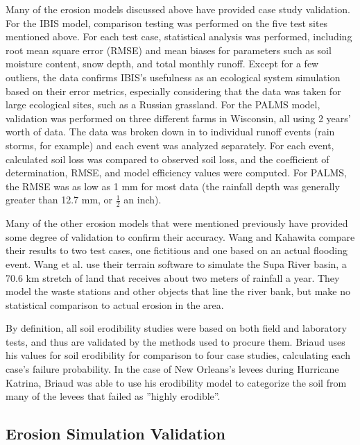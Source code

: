 Many of the erosion models discussed above have provided case study validation. For the IBIS model, comparison testing was performed on the five test sites mentioned above. For each test case, statistical analysis was performed, including root mean square error (RMSE) and mean biases for parameters such as soil moisture content, snow depth, and total monthly runoff. Except for a few outliers, the data confirms IBIS's usefulness as an ecological system simulation based on their error metrics, especially considering that the data was taken for large ecological sites, such as a Russian grassland. For the PALMS model, validation was performed on three different farms in Wisconsin, all using 2 years' worth of data. The data was broken down in to individual runoff events (rain storms, for example) and each event was analyzed separately. For each event, calculated soil loss was compared to observed soil loss, and the coefficient of determination, RMSE, and model efficiency values were computed. For PALMS, the RMSE was as low as 1 mm for most data (the rainfall depth was generally greater than 12.7 mm, or $\frac{1}{2}$ an inch). 

Many of the other erosion models that were mentioned previously have provided some degree of validation to confirm their accuracy. Wang and Kahawita \cite{Wang-ModelingTheHydraulics} compare their results to two test cases, one fictitious and one based on an actual flooding event. Wang et al. \cite{Wang-EmbankmentOvertopping} use their terrain software to simulate the Supa River basin, a 70.6 km stretch of land that receives about two meters of rainfall a year. They model the waste stations and other objects that line the river bank, but make no statistical comparison to actual erosion in the area.

By definition, all soil erodibility studies were based on both field and laboratory tests, and thus are validated by the methods used to procure them. Briaud \cite{Briaud-CaseHistories} uses his values for soil erodibility for comparison to four case studies, calculating each case's failure probability. In the case of New Orleans's levees during Hurricane Katrina, Briaud was able to use his erodibility model to categorize the soil from many of the levees that failed as ''highly erodible''.

\subsection{Erosion Simulation Validation}
\label{section:sim_validation}

